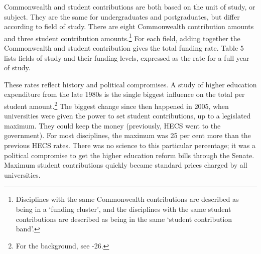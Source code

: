 \documentclass{grattan}
\begin{document}
Commonwealth and student contributions are both based on the unit of study, or subject. They are the same for undergraduates and postgraduates, but differ according to field of study. There are eight Commonwealth contribution amounts and three student contribution amounts.\footnote{Disciplines with the same Commonwealth contributions are described as being in a `funding cluster', and the disciplines with the same student contributions are described as being in the same `student contribution band'.} For each field, adding together the Commonwealth and student contribution gives the total funding rate. Table 5 lists fields of study and their funding levels, expressed as the rate for a full year of study.

These rates reflect history and political compromises. A study of higher education expenditure from the late 1980s is the single biggest influence on the total per student amount.\footnote{For the background, see \textcite[][24]{DEEWR2010thehighereducatio}-26.} The biggest change since then happened in 2005, when universities were given the power to set student contributions, up to a legislated maximum. They could keep the money (previously, HECS went to the government). For most disciplines, the maximum was 25 per cent more than the previous HECS rates. There was no science to this particular percentage; it was a political compromise to get the higher education reform bills through the Senate. Maximum student contributions quickly became standard prices charged by all universities.

\begin{table} \caption{Contributions for a 2018 Commonwealth-supported place}


\end{table}
\end{document}
